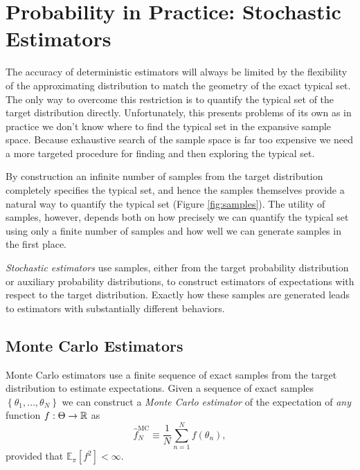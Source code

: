 \chapter{Probability in Practice: Stochastic Estimators}

The accuracy of deterministic estimators will always be limited by
the flexibility of the approximating distribution to match the geometry 
of the exact typical set.  The only way to overcome this restriction is 
to quantify the typical set of the target distribution directly.  Unfortunately, 
this presents problems of its own as in practice we don't know where to 
find the typical set in the expansive sample space.  Because exhaustive 
search of the sample space is far too expensive we need a more targeted 
procedure for finding and then exploring the typical set.

By construction an infinite number of samples from the target distribution 
completely specifies the typical set, and hence the samples themselves 
provide a natural way to quantify the typical set (Figure \ref{fig:samples}).  
The utility of samples, however, depends both on how precisely we can 
quantify the typical set using only a finite number of samples and how
well we can generate samples in the first place.

\emph{Stochastic estimators} use samples, either from the target probability
distribution or auxiliary probability distributions, to construct estimators 
of expectations with respect to the target distribution.  Exactly how these
samples are generated leads to estimators with substantially different 
behaviors.

\section{Monte Carlo Estimators}

Monte Carlo estimators use a finite sequence of exact samples from
the target distribution to estimate expectations.  Given a sequence
of exact samples $\left\{ \theta_{1}, \ldots, \theta_{N} \right\}$ we can
construct a  \emph{Monte Carlo estimator} of the expectation of 
\emph{any} function $f : \Theta \rightarrow \mathbb{R}$ as
%
\begin{equation*}
\hat{f}^{\mathrm{MC}}_{N} \equiv
\frac{1}{N} \sum_{n = 1}^{N} f \! \left( \theta_{n} \right),
\end{equation*}
%
provided that $\mathbb{E}_{\pi} \! \left[ f^{2} \right] < \infty$.

